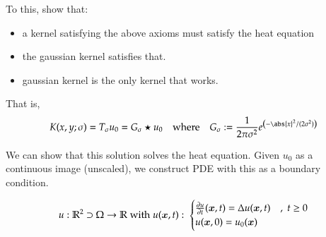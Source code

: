    To this, show that:
    \begin{itemize}
    \item a kernel satisfying the above axioms must satisfy the heat equation
  	\item the gaussian kernel satisfies that.
    \item gaussian kernel is the only kernel that works.
    \end{itemize}
    
    That is,
    \begin{equation}
   K(x,y;\sigma) = T_{\sigma} u_0 = G_\sigma \star u_0
   	\quad \textrm{where}\quad
   	G_\sigma := \frac{1}{2\pi \sigma^2} e^{\left(-\abs{x}^2 / (2\sigma^2)\right)}
    \end{equation}
    
	We can show that this solution solves the heat equation.
	Given $u_0$ as a continuous image (unscaled),
	we construct PDE with this as a boundary condition.
    
    \begin{equation}
    u: \mathbb{R}^2 \supset \Omega \to \mathbb{R} \; \textrm{with} \; u(\bm{x},t) : \;
    \begin{cases}
    \frac{\partial u}{\partial t} (\bm{x}, t) = \Delta u(\bm{x},t) & ,\; t \ge 0 \\
    u(\bm{x},0) = u_0(\bm{x}) 
    \end{cases}
    \end{equation}
    

